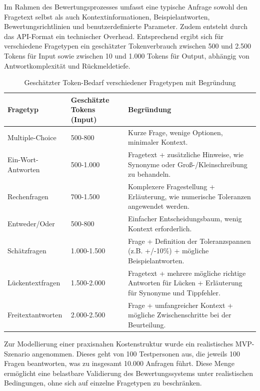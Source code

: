 \documentclass[a4paper,12pt]{article}
\begin{document}
Im Rahmen des Bewertungsprozesses umfasst eine typische Anfrage sowohl den Fragetext selbst als auch Kontextinformationen, Beispielantworten, Bewertungsrichtlinien und benutzerdefinierte Parameter. Zudem entsteht durch das API-Format ein technischer Overhead. Entsprechend ergibt sich für verschiedene Fragetypen ein geschätzter Tokenverbrauch zwischen 500 und 2.500 Tokens für Input sowie zwischen 10 und 1.000 Tokens für Output, abhängig von Antwortkomplexität und Rückmeldetiefe.

\begin{table}[ht]
    \centering
    \small
    \begin{tabular}{|l|l|p{7cm}|}
        \hline
        \textbf{Fragetyp} & \textbf{Geschätzte Tokens (Input)} & \textbf{Begründung} \\
        \hline
        Multiple-Choice & 500-800 & Kurze Frage, wenige Optionen, minimaler Kontext. \\
        \hline
        Ein-Wort-Antworten & 500-1.000 & Fragetext + zusätzliche Hinweise, wie Synonyme oder Groß-/Kleinschreibung zu behandeln. \\
        \hline
        Rechenfragen & 700-1.500 & Komplexere Fragestellung + Erläuterung, wie numerische Toleranzen angewendet werden. \\
        \hline
        Entweder/Oder & 500-800 & Einfacher Entscheidungsbaum, wenig Kontext erforderlich. \\
        \hline
        Schätzfragen & 1.000-1.500 & Frage + Definition der Toleranzspannen (z.B. +/-10\%) + mögliche Beispielantworten. \\
        \hline
        Lückentextfragen & 1.500-2.000 & Fragetext + mehrere mögliche richtige Antworten für Lücken + Erläuterung für Synonyme und Tippfehler. \\
        \hline
        Freitextantworten & 2.000-2.500 & Frage + umfangreicher Kontext + mögliche Zwischenschritte bei der Beurteilung. \\
        \hline
    \end{tabular}
    \caption{Geschätzter Token-Bedarf verschiedener Fragetypen mit Begründung}
    \label{tab:tokenbedarf-fragetypen}
\end{table}



Zur Modellierung einer praxisnahen Kostenstruktur wurde ein realistisches MVP-Szenario angenommen. Dieses geht von 100 Testpersonen aus, die jeweils 100 Fragen beantworten, was zu insgesamt 10.000 Anfragen führt. Diese Menge ermöglicht eine belastbare Validierung des Bewertungssystems unter realistischen Bedingungen, ohne sich auf einzelne Fragetypen zu beschränken.
\end{document}
